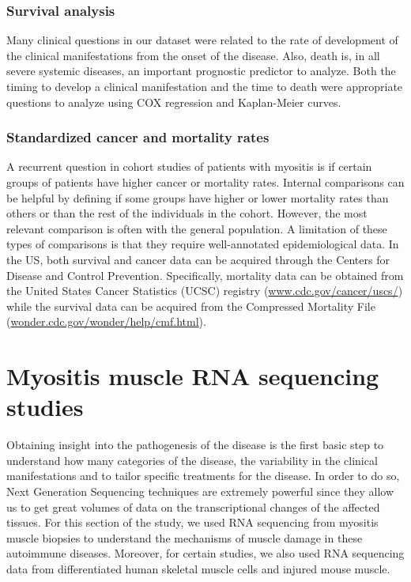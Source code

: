 \subsubsection{Survival analysis}
Many clinical questions in our dataset were related to the rate of development of the clinical manifestations from the onset of the disease. Also, death is, in all severe systemic diseases, an important prognostic predictor to analyze. Both the timing to develop a clinical manifestation and the time to death were appropriate questions to analyze using COX regression and Kaplan-Meier curves.

\subsubsection{Standardized cancer and mortality rates}
A recurrent question in cohort studies of patients with myositis is if certain groups of patients have higher cancer or mortality rates. Internal comparisons can be helpful by defining if some groups have higher or lower mortality rates than others or than the rest of the individuals in the cohort. However, the most relevant comparison is often with the general population. A limitation of these types of comparisons is that they require well-annotated epidemiological data. In the US, both survival and cancer data can be acquired through the Centers for Disease and Control Prevention. Specifically, mortality data can be obtained from the United States Cancer Statistics (UCSC) registry (\url{www.cdc.gov/cancer/uscs/}) while the survival data can be acquired from the Compressed Mortality File (\url{wonder.cdc.gov/wonder/help/cmf.html}).

\section{Myositis muscle RNA sequencing studies}
Obtaining insight into the pathogenesis of the disease is the first basic step to understand how many categories of the disease, the variability in the clinical manifestations and to tailor specific treatments for the disease. In order to do so, Next Generation Sequencing techniques are extremely powerful since they allow us to get great volumes of data on the transcriptional changes of the affected tissues. For this section of the study, we used RNA sequencing from myositis muscle biopsies to understand the mechanisms of muscle damage in these autoimmune diseases. Moreover, for certain studies, we also used RNA sequencing data from differentiated human skeletal muscle cells and injured mouse muscle.

